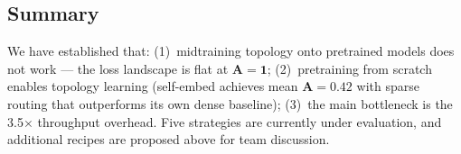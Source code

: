 \documentclass[11pt,a4paper]{article}
\newcommand{\A}{\mathbf{A}}
\begin{document}
\subsection{Summary}

We have established that: (1)~midtraining topology onto pretrained models does not work --- the loss landscape is flat at $\A=\mathbf{1}$; (2)~pretraining from scratch enables topology learning (self-embed achieves mean $\A=0.42$ with sparse routing that outperforms its own dense baseline); (3)~the main bottleneck is the 3.5$\times$ throughput overhead. Five strategies are currently under evaluation, and additional recipes are proposed above for team discussion.
\end{document}
